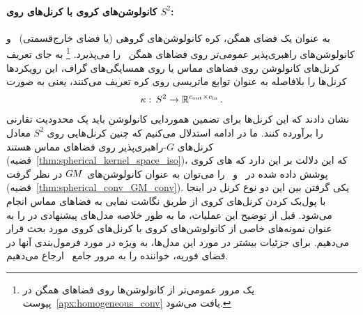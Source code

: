 \paragraph{کانولوشن‌های کروی با کرنل‌های روی $S^2$:}

به عنوان یک فضای همگن، کره کانولوشن‌های گروهی (یا فضای خارج‌قسمتی)~\cite{Kondor2018-GENERAL} و کانولوشن‌های راهبری‌پذیر عمومی‌تر روی فضاهای همگن~\cite{Cohen2019-generaltheory} را می‌پذیرد.%
\footnote{
	یک مرور عمومی‌تر از کانولوشن‌ها روی فضاهای همگن در پیوست~\ref{apx:homogeneous_conv} یافت می‌شود.
}
به جای تعریف کرنل‌های کانولوشن روی فضاهای مماس یا روی همسایگی‌های گراف، این رویکردها کرنل‌ها را بلافاصله به عنوان توابع ماتریسی روی کره تعریف می‌کنند، یعنی به صورت
\begin{align}\label{eq:spherical_kernel}
	\kappa:\, S^2 \to \mathbb{R}^{{c_\textup{out}}\times{c_\textup{in}}} \,.
\end{align}
\citet{Cohen2019-generaltheory} نشان دادند که این کرنل‌ها برای تضمین هموردایی کانولوشن باید یک محدودیت تقارنی را برآورده کنند.
ما در ادامه استدلال می‌کنیم که چنین کرنل‌هایی روی $S^2$ معادل کرنل‌های $G$-راهبری‌پذیر روی فضاهای مماس هستند (قضیه~\ref{thm:spherical_kernel_space_iso})، که این دلالت بر این دارد که های کروی پوشش داده شده در~\cite{Cohen2019-generaltheory} و~\cite{Kondor2018-GENERAL} را می‌توان به عنوان کانولوشن‌های $G\mkern-1.4muM$ در نظر گرفت (قضیه~\ref{thm:spherical_conv_GM_conv}).
یکی گرفتن بین این دو نوع کرنل در اینجا با پول‌بک کردن کرنل‌های کروی از طریق نگاشت نمایی به فضاهای مماس انجام می‌شود.
قبل از توضیح این عملیات، ما به طور خلاصه مدل‌های پیشنهادی در \cite{Cohen2018-S2CNN,esteves2018zonalSpherical,esteves2020spinweighted,kondor2018ClebschGordan} را به عنوان نمونه‌های خاصی از کانولوشن‌های کروی با کرنل‌های کروی مورد بحث قرار می‌دهیم.
برای جزئیات بیشتر در مورد این مدل‌ها، به ویژه در مورد فرمول‌بندی آنها در فضای فوریه، خواننده را به مرور جامع~\citet{esteves2020theoretical} ارجاع می‌دهیم.



